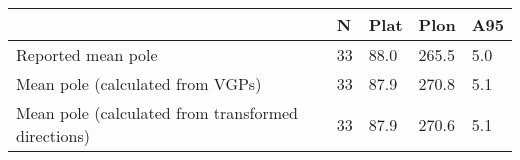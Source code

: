 \begin{tabular}{lllll}
\toprule
{} &   N &  Plat &   Plon &  A95 \\
\midrule
Reported mean pole                                 &  33 &  88.0 &  265.5 &  5.0 \\
Mean pole (calculated from VGPs)                   &  33 &  87.9 &  270.8 &  5.1 \\
Mean pole (calculated from transformed directions) &  33 &  87.9 &  270.6 &  5.1 \\
\bottomrule
\end{tabular}
